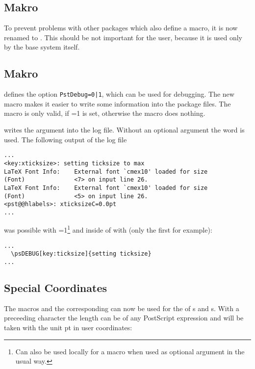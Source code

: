 \documentclass[11pt,english,BCOR10mm,DIV12,bibliography=totoc,parskip=false,smallheadings
    headexclude,footexclude,oneside]{pst-doc}
\begin{document}
\subsection{Makro }
To prevent problems with other packages which also define a 
macro, it is now renamed to . This should be not important
for the user, because it is used only by the base system itself.

\subsection{Makro }
 defines the option \texttt{PstDebug=0|1}, which can be used for 
debugging. The new macro  makes it easier to write some 
information into the package files. The macro is only valid, if =1
is set, otherwise the macro does nothing.

\begin{BDef}
\OptArgs{}
\end{BDef}

 writes the argument  into the log file.
Without an optional argument the word  is used. The following output 
of the log file 

\begin{lstlisting}
...
<key:xticksize>: setting ticksize to max
LaTeX Font Info:    External font `cmex10' loaded for size
(Font)              <7> on input line 26.
LaTeX Font Info:    External font `cmex10' loaded for size
(Font)              <5> on input line 26.
<pst@@hlabels>: xticksizeC=0.0pt
...
\end{lstlisting}

was possible with =1\footnote{Can also be used locally for a 
macro when used as optional argument
in the usual way.} 
and inside of  with 
(only the first for example):
\begin{lstlisting}
...
  \psDEBUG[key:ticksize]{setting ticksize}
...
\end{lstlisting}

\subsection{Special Coordinates}
The macros  and the corresponding  can now be used for
the  of s and s. With a preceeding \Lnotation{!} character the length can
be of any PostScript expression and will be taken with the unit pt in user coordinates: 
\end{document}
